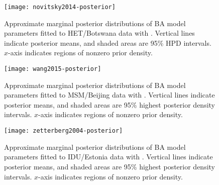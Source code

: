 \begin{figure}[ht]
    \texttt{[image: novitsky2014-posterior]}
    \caption[
        Approximate marginal posterior distributions of \gls{BA} model
        parameters fitted to HET/Botswana data with .
    ]{
        Approximate marginal posterior distributions of \gls{BA} model
        parameters fitted to HET/Botswana data with . Vertical
        lines indicate posterior means, and shaded areas are 95\% \gls{HPD}
        intervals. $x$-axis indicates regions of nonzero prior density.
    }
    \label{fig:novitsky}
\end{figure}

\begin{figure}[ht]
    \texttt{[image: wang2015-posterior]}
    \caption[
        Approximate marginal posterior distributions of \gls{BA} model
        parameters fitted to MSM/Beijing data with .
    ]{
        Approximate marginal posterior distributions of \gls{BA} model
        parameters fitted to MSM/Beijing data with . Vertical
        lines indicate posterior means, and shaded areas are 95\% highest
        posterior density intervals. $x$-axis indicates regions of nonzero
        prior density.
    }
    \label{fig:wang}
\end{figure}

\begin{figure}[ht]
    \texttt{[image: zetterberg2004-posterior]}
    \caption[
        Approximate marginal posterior distributions of \gls{BA} model
        parameters fitted to IDU/Estonia data with .
    ]{
        Approximate marginal posterior distributions of \gls{BA} model
        parameters fitted to IDU/Estonia data with . Vertical
        lines indicate posterior means, and shaded areas are 95\% highest
        posterior density intervals. $x$-axis indicates regions of nonzero
        prior density.
    }
    \label{fig:zetterberg}
\end{figure}

